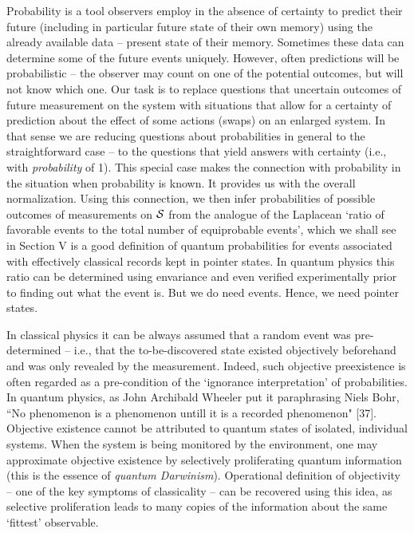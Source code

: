 \documentclass[aps,pra,epsfig,11pt,floatfix]{revtex4}
\begin{document}
Probability is a tool observers employ in the absence of certainty to predict
their future (including in particular future state of their own memory) using
the already available data -- present state of their memory. Sometimes these
data can determine some of the future events uniquely. However, often
predictions will be probabilistic -- the observer may count on one of
the potential outcomes, but will not know which one. Our task is to replace
questions that uncertain outcomes of future measurement on the system
with situations that allow for a certainty of prediction about the effect of
some actions (swaps) on an enlarged system. In that sense we are reducing 
questions about probabilities in general to the straightforward case -- to the
questions that yield answers with certainty (i.e., with {\it probability} of 1). This special
case makes the connection with probability in the situation when probability 
is known. It provides us with the overall normalization. Using this connection,
we then infer probabilities of possible outcomes of measurements on ${\cal S}$ 
from the analogue of the Laplacean `ratio of favorable events to the total number 
of equiprobable events', which we shall see in Section V is a good definition of 
quantum probabilities for events associated with effectively classical records 
kept in pointer states. In quantum physics this ratio can be determined using 
envariance and even verified experimentally prior to finding out what the event is. 
But we do need events. Hence, we need pointer states.

In classical physics it can be always assumed that a random event was
pre-determined -- i.e., that the to-be-discovered state existed objectively
beforehand and was only revealed by the measurement. Indeed, such objective
preexistence is often regarded as a pre-condition of the `ignorance
interpretation' of probabilities. In quantum physics, as John Archibald Wheeler
put it paraphrasing Niels Bohr, ``No phenomenon is a phenomenon untill it is
a recorded phenomenon" [37]. Objective existence cannot be attributed 
to quantum states of isolated, individual systems. When the system is being 
monitored by the environment, one may approximate objective existence 
by selectively proliferating quantum information (this is the essence of 
{\it quantum Darwinism}). Operational definition of objectivity -- one of the key
symptoms of classicality -- can be recovered using this idea, as selective
proliferation leads to many copies of the information about the same
`fittest' observable.
\end{document}
